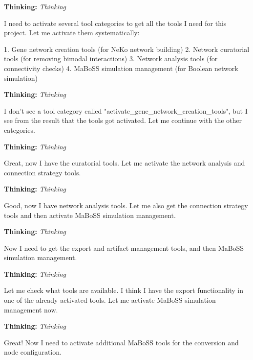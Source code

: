 \documentclass[11pt,a4paper]{article}
\begin{document}
\begin{thinkbox}
\textbf{Thinking:} \textit{Thinking}

I need to activate several tool categories to get all the tools I need for this project. Let me activate them systematically:

1. Gene network creation tools (for NeKo network building)
2. Network curatorial tools (for removing bimodal interactions) 
3. Network analysis tools (for connectivity checks)
4. MaBoSS simulation management (for Boolean network simulation)

\end{thinkbox}
\begin{thinkbox}
\textbf{Thinking:} \textit{Thinking}

I don't see a tool category called "activate\_gene\_network\_creation\_tools", but I see from the result that the tools got activated. Let me continue with the other categories.

\end{thinkbox}
\begin{thinkbox}
\textbf{Thinking:} \textit{Thinking}

Great, now I have the curatorial tools. Let me activate the network analysis and connection strategy tools.

\end{thinkbox}
\begin{thinkbox}
\textbf{Thinking:} \textit{Thinking}

Good, now I have network analysis tools. Let me also get the connection strategy tools and then activate MaBoSS simulation management.

\end{thinkbox}
\begin{thinkbox}
\textbf{Thinking:} \textit{Thinking}

Now I need to get the export and artifact management tools, and then MaBoSS simulation management.

\end{thinkbox}
\begin{thinkbox}
\textbf{Thinking:} \textit{Thinking}

Let me check what tools are available. I think I have the export functionality in one of the already activated tools. Let me activate MaBoSS simulation management now.

\end{thinkbox}
\begin{thinkbox}
\textbf{Thinking:} \textit{Thinking}

Great! Now I need to activate additional MaBoSS tools for the conversion and node configuration.

\end{thinkbox}
\end{document}
